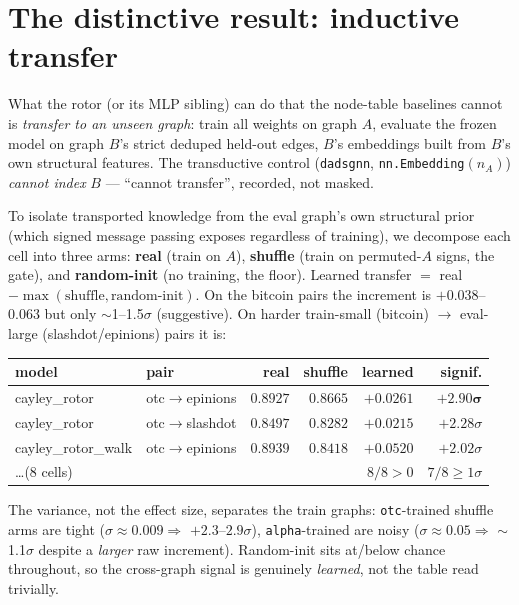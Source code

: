 \documentclass[11pt, a4paper]{article}
\begin{document}
\section{The distinctive result: inductive transfer}
What the rotor (or its MLP sibling) can do that the node-table baselines cannot is
\emph{transfer to an unseen graph}: train all weights on graph $A$, evaluate the frozen
model on graph $B$'s strict deduped held-out edges, $B$'s embeddings built from $B$'s
own structural features. The transductive control (\texttt{dadsgnn},
\texttt{nn.Embedding}$(n_A)$) \emph{cannot index} $B$ --- ``cannot transfer'', recorded,
not masked.

To isolate transported knowledge from the eval graph's own structural prior (which signed
message passing exposes regardless of training), we decompose each cell into three arms:
\textbf{real} (train on $A$), \textbf{shuffle} (train on permuted-$A$ signs, the gate),
and \textbf{random-init} (no training, the floor). Learned transfer $=$
real $-\max(\text{shuffle},\text{random-init})$. On the bitcoin pairs the increment is
$+0.038$--$0.063$ but only $\sim$1--1.5$\sigma$ (suggestive). On harder train-small
(bitcoin) $\to$ eval-large (slashdot/epinions) pairs it is:

\begin{center}\small
\begin{tabular}{@{}llrrrr@{}}
\toprule
model & pair & real & shuffle & learned & signif. \\
\midrule
cayley\_rotor      & otc$\to$epinions & $0.8927$ & $0.8665$ & $+0.0261$ & $\mathbf{+2.90\sigma}$ \\
cayley\_rotor      & otc$\to$slashdot & $0.8497$ & $0.8282$ & $+0.0215$ & $+2.28\sigma$ \\
cayley\_rotor\_walk & otc$\to$epinions & $0.8939$ & $0.8418$ & $+0.0520$ & $+2.02\sigma$ \\
\dots (8 cells)    &                  &          &          & $8/8>0$   & $7/8\geq1\sigma$ \\
\bottomrule
\end{tabular}
\end{center}

The variance, not the effect size, separates the train graphs: \texttt{otc}-trained
shuffle arms are tight ($\sigma\!\approx\!0.009 \Rightarrow$ $+2.3$--$2.9\sigma$),
\texttt{alpha}-trained are noisy ($\sigma\!\approx\!0.05 \Rightarrow$ $\sim$1.1$\sigma$
despite a \emph{larger} raw increment). Random-init sits at/below chance throughout, so
the cross-graph signal is genuinely \emph{learned}, not the table read trivially.
\end{document}
